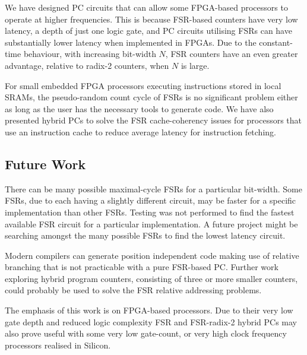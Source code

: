 \documentclass[5p, twocolumn]{elsarticle}
\begin{document}
We have designed PC circuits that can allow some FPGA-based processors to operate
at higher frequencies. This is because FSR-based counters have very low latency,
a depth of just one logic gate, and PC circuits utilising FSRs can have
substantially lower latency when implemented in FPGAs. Due to the constant-time
behaviour, with increasing bit-width $N$, FSR counters have an even greater
advantage, relative to radix-2 counters, when $N$ is large.

For small embedded FPGA processors executing instructions stored in local SRAMs,
the pseudo-random count cycle of FSRs is no significant problem either as long as
the user has the necessary tools to generate code. We have also presented hybrid
PCs to solve the FSR cache-coherency issues for processors that use an
instruction cache to reduce average latency for instruction fetching.


\subsection{Future Work}

There can be many possible maximal-cycle FSRs for a particular bit-width. Some
FSRs, due to each having a slightly different circuit, may be faster for a
specific implementation than other FSRs. Testing was not performed to find the
fastest available FSR circuit for a particular implementation. A future project
might be searching amongst the many possible FSRs to find the lowest latency
circuit.

Modern compilers can generate position independent code making use of relative
branching that is not practicable with a pure FSR-based PC. Further work
exploring hybrid program counters, consisting of three or more smaller counters,
could probably be used to solve the FSR relative addressing problems.

The emphasis of this work is on FPGA-based processors. Due to their very low gate
depth and reduced logic complexity FSR and FSR-radix-2 hybrid PCs may also prove
useful with some very low gate-count, or very high clock frequency processors
realised in Silicon.





\end{document}
